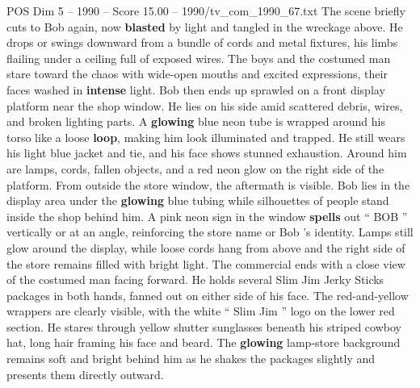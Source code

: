 \begin{textsample}{POS Dim 5 – 1990 – Score 15.00 – 1990/tv\_com\_1990\_67.txt}
The scene briefly cuts to Bob again, now \textbf{blasted} by light and tangled in the wreckage above.
He drops or swings downward from a bundle of cords and metal fixtures, his limbs flailing under a ceiling full of exposed wires.
The boys and the costumed man stare toward the chaos with wide-open mouths and excited expressions, their faces washed in \textbf{intense} light.
Bob then ends up sprawled on a front display platform near the shop window.
He lies on his side amid scattered debris, wires, and broken lighting parts.
A \textbf{glowing} blue neon tube is wrapped around his torso like a loose \textbf{loop}, making him look illuminated and trapped.
He still wears his light blue jacket and tie, and his face shows stunned exhaustion.
Around him are lamps, cords, fallen objects, and a red neon glow on the right side of the platform.
From outside the store window, the aftermath is visible.
Bob lies in the display area under the \textbf{glowing} blue tubing while silhouettes of people stand inside the shop behind him.
A pink neon sign in the window \textbf{spells} out “ BOB ” vertically or at an angle, reinforcing the store name or Bob ’s identity.
Lamps still glow around the display, while loose cords hang from above and the right side of the store remains filled with bright light.
The commercial ends with a close view of the costumed man facing forward.
He holds several Slim Jim Jerky Sticks packages in both hands, fanned out on either side of his face.
The red-and-yellow wrappers are clearly visible, with the white “ Slim Jim ” logo on the lower red section.
He stares through yellow shutter sunglasses beneath his striped cowboy hat, long hair framing his face and beard.
The \textbf{glowing} lamp-store background remains soft and bright behind him as he shakes the packages slightly and presents them directly outward.

\end{textsample}
